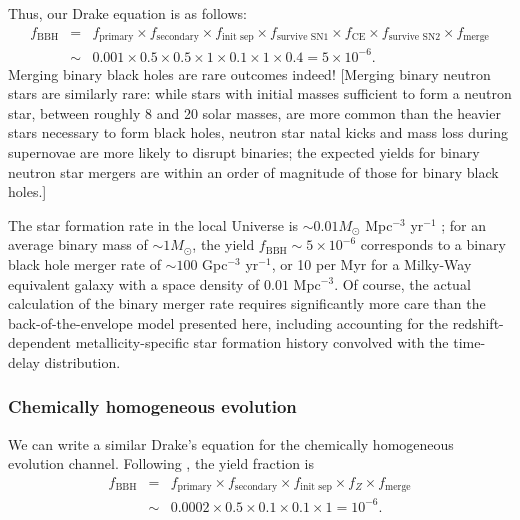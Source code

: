 \documentclass[iop,onecolumn]{revtex4}
\begin{document}
Thus, our Drake equation is as follows:
\begin{eqnarray}
f_\textrm{BBH} &=& f_\textrm{primary} \times f_\textrm{secondary} \times f_\textrm{init sep} \times f_\textrm{survive SN1} \times f_\textrm{CE} \times f_\textrm{survive SN2} \times f_\textrm{merge} \nonumber \\
 & \sim & 0.001 \times 0.5 \times 0.5 \times 1 \times 0.1 \times 1 \times 0.4 = 5 \times 10^{-6}.
\end{eqnarray}
Merging binary black holes are rare outcomes indeed!  [Merging binary neutron stars are similarly rare: while stars with initial masses sufficient to form a neutron star, between roughly 8 and 20 solar masses, are more common than the heavier stars necessary to form black holes, neutron star natal kicks and mass loss during supernovae are more likely to disrupt binaries; the expected yields for binary neutron star mergers are within an order of magnitude of those for binary black holes.]

The star formation rate in the local Universe is $\sim 0.01 M_\odot$ Mpc$^{-3}$ yr$^{-1}$ \citep{MadauDickinson:2014}; for an average binary mass of $\sim 1 M_\odot$, the yield $f_\textrm{BBH} \sim 5 \times 10^{-6}$ corresponds to a binary black hole merger rate of $\sim 100$ Gpc$^{-3}$ yr$^{-1}$, or 10 per Myr for a Milky-Way equivalent galaxy with a space density of $0.01$ Mpc$^{-3}$.  Of course, the actual calculation of the binary merger rate requires significantly more care than the back-of-the-envelope model presented here, including accounting for the redshift-dependent metallicity-specific star formation history convolved with the time-delay distribution.  

\subsubsection{Chemically homogeneous evolution}

We can write a similar Drake's equation for the chemically homogeneous evolution channel.  Following \citet{MandeldeMink:2016},  the yield fraction is
\begin{eqnarray}
f_\textrm{BBH} &=& f_\textrm{primary} \times f_\textrm{secondary} \times f_\textrm{init sep} \times f_Z \times f_\textrm{merge} \nonumber \\
 & \sim & 0.0002 \times 0.5 \times 0.1 \times 0.1 \times 1 = 10^{-6}.
\end{eqnarray}
\end{document}
